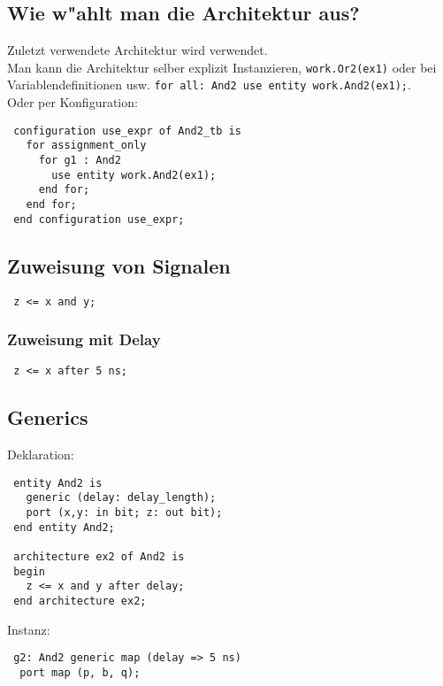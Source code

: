 \documentclass[german, 10pt, a4paper, twocolumn]{scrartcl}
\theoremstyle{definition}
\begin{document}
\subsection{Wie w"ahlt man die Architektur aus?}

Zuletzt verwendete Architektur wird verwendet.\\

Man kann die Architektur selber explizit Instanzieren, \texttt{work.Or2(ex1)} oder bei Variablendefinitionen usw. \texttt{for all: And2 use entity work.And2(ex1);}.\\

Oder per Konfiguration:
\begin{verbatim}
 configuration use_expr of And2_tb is
   for assignment_only
     for g1 : And2
       use entity work.And2(ex1);
     end for;
   end for;
 end configuration use_expr;
\end{verbatim}

\subsection{Zuweisung von Signalen}

\begin{verbatim}
 z <= x and y;
\end{verbatim}

\subsubsection{Zuweisung mit Delay}

\begin{verbatim}
 z <= x after 5 ns;
\end{verbatim}

\subsection{Generics}

Deklaration:
\begin{verbatim}
 entity And2 is
   generic (delay: delay_length);
   port (x,y: in bit; z: out bit);
 end entity And2;

 architecture ex2 of And2 is
 begin
   z <= x and y after delay;
 end architecture ex2;
\end{verbatim}

Instanz:
\begin{verbatim}
 g2: And2 generic map (delay => 5 ns)
  port map (p, b, q);
\end{verbatim}
\end{document}

